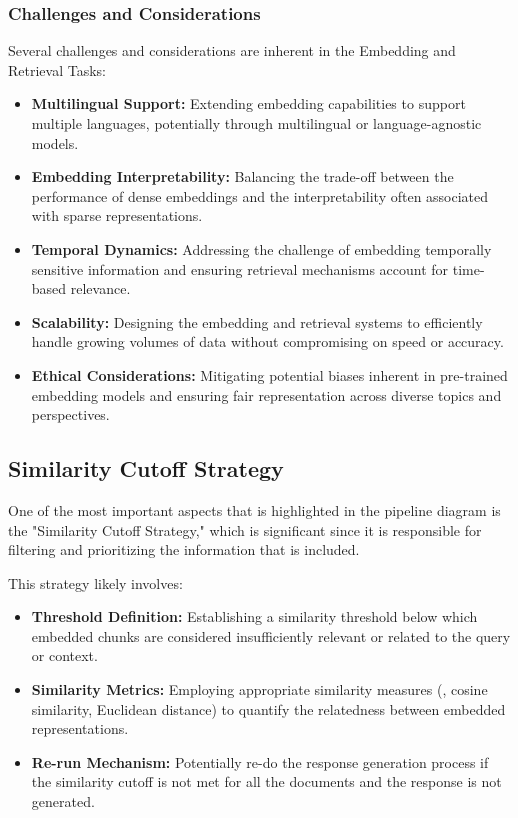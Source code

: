 \subsubsection{Challenges and Considerations}
Several challenges and considerations are inherent in the Embedding and Retrieval Tasks:
\begin{itemize}
    \item \textbf{Multilingual Support:} Extending embedding capabilities to support multiple languages, potentially through multilingual or language-agnostic models.
    \item \textbf{Embedding Interpretability:} Balancing the trade-off between the performance of dense embeddings and the interpretability often associated with sparse representations.
    \item \textbf{Temporal Dynamics:} Addressing the challenge of embedding temporally sensitive information and ensuring retrieval mechanisms account for time-based relevance.
    \item \textbf{Scalability:} Designing the embedding and retrieval systems to efficiently handle growing volumes of data without compromising on speed or accuracy.
    \item \textbf{Ethical Considerations:} Mitigating potential biases inherent in pre-trained embedding models and ensuring fair representation across diverse topics and perspectives.
\end{itemize}

\subsection{Similarity Cutoff Strategy}\label{subsec:similarity-cutoff-strategy}
One of the most important aspects that is highlighted in the pipeline diagram is the "Similarity Cutoff Strategy," which is significant since it is responsible for filtering and prioritizing the information that is included.

This strategy likely involves:
\begin{itemize}
    \item \textbf{Threshold Definition:} Establishing a similarity threshold below which embedded chunks are considered insufficiently relevant or related to the query or context.
    \item \textbf{Similarity Metrics:} Employing appropriate similarity measures (\eg, cosine similarity, Euclidean distance) to quantify the relatedness between embedded representations.
    \item \textbf{Re-run Mechanism:} Potentially re-do the response generation process if the similarity cutoff is not met for all the documents and the response is not generated.
\end{itemize}

